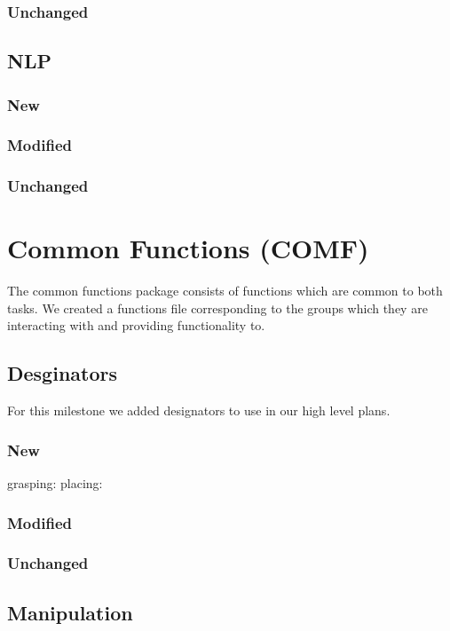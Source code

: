 \documentclass[main.tex]{subfiles}
\begin{document}
                \subsubsection{Unchanged}
                \subsection{NLP}
                \subsubsection{New}
                \subsubsection{Modified}
                \subsubsection{Unchanged}

                
                \section{Common Functions (COMF)}
                The common functions package consists of functions which are common to both tasks. We created a functions file corresponding to the groups which they are interacting with and providing functionality to.
                \subsection{Desginators}
                For this milestone we added designators to use in our high level plans.
                \subsubsection{New}
                grasping:
                placing:
                \subsubsection{Modified}
                \subsubsection{Unchanged}
                
                \subsection{Manipulation}
\end{document}
